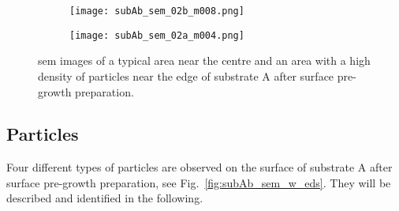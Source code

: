 \begin{figure}[htbp]
    \begin{subfigure}[t]{0.49\textwidth}
        \texttt{[image: subAb\_sem\_02b\_m008.png]}
        \caption{}\label{fig:subAb_sem_typical_centre}
    \end{subfigure}%
    \hfill
    \begin{subfigure}[t]{0.49\textwidth}
        \texttt{[image: subAb\_sem\_02a\_m004.png]}
        \caption{}\label{fig:subAb_sem_typical_edge}
    \end{subfigure}%
    \caption[\Ac{sem} images of typical areas on substrate A with surface pre-growth preparation.]{\Acf{sem} images of  a typical area near the centre and  an area with a high density of particles near the edge of substrate A after surface pre-growth preparation.}\label{fig:subAb_sem_typical}
\end{figure}

\subsection{Particles}
Four different types of particles are observed on the surface of substrate A after surface pre-growth preparation, see Fig.~\ref{fig:subAb_sem_w_eds}. They will be described and identified in the following.

